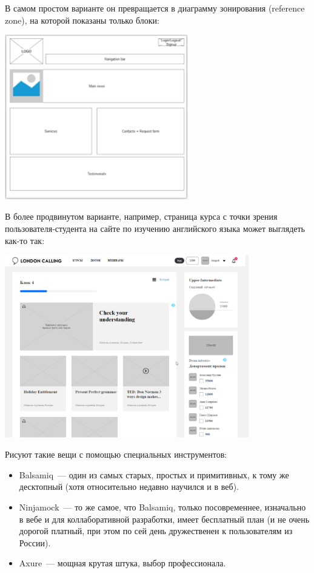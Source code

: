 \documentclass{../../text-style}
\begin{document}
В самом простом варианте он превращается в диаграмму зонирования (reference zone), на которой показаны только блоки:

\begin{center}
    \includegraphics[width=0.6\textwidth]{wireframe.png}
\end{center}

В более продвинутом варианте, например, страница курса с точки зрения пользователя-студента на сайте по изучению английского языка может выглядеть как-то так:

\begin{center}
    \includegraphics[width=0.8\textwidth]{languageServiceWireframe.png}
\end{center}

Рисуют такие вещи с помощью специальных инструментов:

\begin{itemize}
    \item Balsamiq~--- один из самых старых, простых и примитивных, к тому же десктопный (хотя относительно недавно научился и в веб).
    \item Ninjamock~--- то же самое, что Balsamiq, только посовременнее, изначально в вебе и для коллаборативной разработки, имеет бесплатный план (и не очень дорогой платный, при этом по сей день дружественен к пользователям из России).
    \item Axure~--- мощная крутая штука, выбор профессионала.
\end{itemize}
\end{document}
